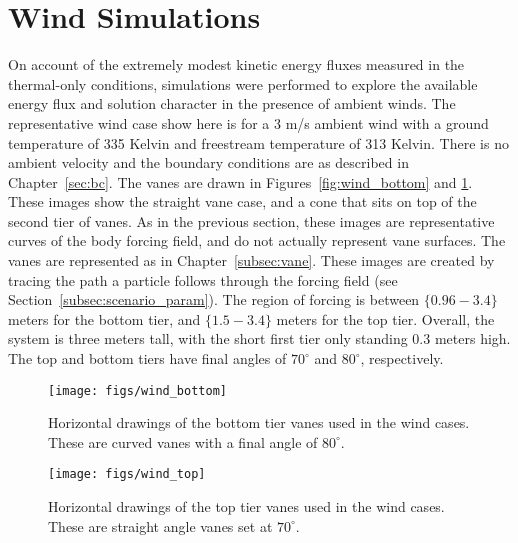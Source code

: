 



\section{Wind Simulations}

On account of the extremely modest kinetic energy fluxes measured in the
thermal-only conditions, simulations were performed to explore the
available energy flux and solution character in the presence of ambient
winds. 
The representative wind case show here is for a 3 m/s ambient wind with
a ground temperature of 335 Kelvin and freestream temperature of 313
Kelvin. There is no ambient velocity and the boundary conditions are as
described in Chapter~\ref{sec:bc}. The vanes are drawn in
Figures~\ref{fig:wind_bottom} and \ref{fig:wind_top}. These images show
the straight vane case, and a cone that sits on top of the second tier of vanes. 
As in the previous section, these images are representative
curves of the body forcing field, and do not actually represent vane
surfaces. The vanes are represented as in Chapter~\ref{subsec:vane}. 
These images are created by tracing the path a particle follows through
the forcing field (see Section~\ref{subsec:scenario_param}). The region
of forcing is between $\{0.96-3.4\}$ meters 
for the bottom tier, and $\{1.5-3.4\}$ meters for the top tier. Overall,
the system is three meters tall, with the short first tier only standing
0.3 meters high. The top and bottom tiers have final angles of
$70^{\circ}$ and $80^{\circ}$, respectively.

\begin{figure}[htb]
\centering
\begin{minipage}{0.45\textwidth}
\centering
 \texttt{[image: figs/wind\_bottom]}
 \caption{Horizontal drawings of the bottom tier vanes used in the wind
 cases. These are curved vanes with a final angle of $80^{\circ}$.}
 \label{fig:wind_bottom}  
\end{minipage}\hfill
\begin{minipage}{0.45\textwidth}
\centering
\texttt{[image: figs/wind\_top]}
\caption{Horizontal drawings of the top tier vanes used in the wind
 cases. These are straight angle vanes set at $70^{\circ}$.} 
 \label{fig:wind_top}  
\end{minipage}
\end{figure}


